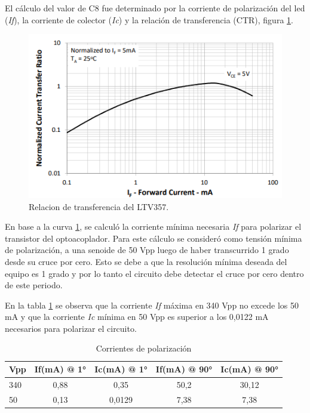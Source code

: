 \newpage

El cálculo del valor de C8 fue determinado por la corriente de polarización del led (\textit{If}), la corriente de colector (\textit{Ic}) y la relación de transferencia (CTR), figura \ref{fig:ltvCtr}.  

\begin{figure}[ht]
	\centering
	\includegraphics[width=130mm]{./Figures/ltvCtr.png}
	\caption{Relacion de transferencia del LTV357.}
	\label{fig:ltvCtr}
\end{figure}

En base a la curva \ref{fig:ltvCtr}, se calculó la corriente mínima necesaria \textit{If} para polarizar el transistor del optoacoplador. Para este cálculo se consideró como tensión mínima de polarización, a una senoide de 50 Vpp luego de haber transcurrido 1 grado desde su cruce por cero. Esto se debe a que la resolución mínima deseada del equipo es 1 grado y por lo tanto el circuito debe detectar el cruce por cero dentro de este periodo.

En la tabla \ref{tab:corriente} se observa que la corriente \textit{If} máxima en 340 Vpp no excede los 50 mA y que la corriente \textit{Ic} mínima en 50 Vpp es superior a los 0,0122 mA necesarios para polarizar el circuito.

\vspace{5mm}

\begin{table}[h]
\centering
\caption[Corrientes de polarización]{Corrientes de polarización}
\begin{tabular}{l c c c c}
\toprule
\textbf{Vpp} & \textbf{If(mA) @ 1°} & \textbf{Ic(mA) @ 1°} & \textbf{If(mA) @ 90°} & \textbf{Ic(mA) @ 90°}\\
\midrule
340 & 0,88 & 0,35 & 50,2 & 30,12 \\
50 & 0,13 & 0,0129 & 7,38 & 7,38\\
\bottomrule
\hline
\end{tabular}
\label{tab:corriente}
\end{table}

